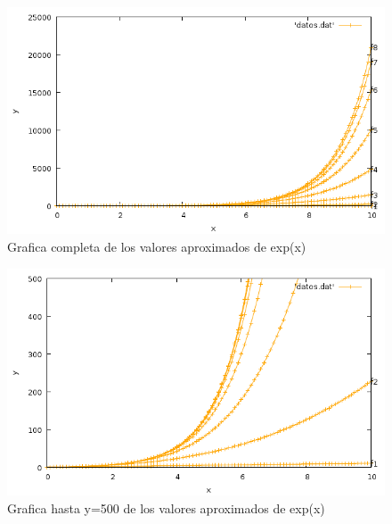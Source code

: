 \documentclass{article}
\begin{document}
\begin{figure}
  \includegraphics[width=\linewidth]{completo.png}
  \caption{Grafica completa de los valores aproximados de exp(x)}
\end{figure}
\begin{figure}
  \includegraphics[width=\linewidth]{escala500.png}
  \caption{Grafica hasta y=500 de los valores aproximados de exp(x)}
\end{figure}
\clearpage
\end{document}
